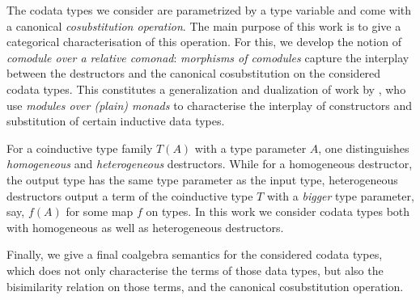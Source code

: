 \documentclass{amsart}
\begin{document}

 The codata types we consider are parametrized by a type variable and come with a canonical \emph{cosubstitution operation}. 
 The main purpose of this work is to give a categorical characterisation
 of this operation. For this, we develop the notion of \emph{comodule over a relative comonad}: \emph{morphisms of comodules} capture the interplay between 
 the destructors and the canonical cosubstitution on the considered codata types.
 This constitutes a generalization and dualization of work by \textcite{DBLP:journals/iandc/HirschowitzM10},
 who use \emph{modules over (plain) monads} to characterise the interplay of constructors and substitution of certain inductive data types.
 
 For a coinductive type family $T(A)$ with a type parameter $A$, one distinguishes \emph{homogeneous} and \emph{heterogeneous} destructors.
 While for a homogeneous destructor, the output type has the same type parameter as the input type, 
 heterogeneous destructors output a term of the coinductive type $T$ with a \emph{bigger} type parameter, say, $f(A)$ for some map $f$ on types.
 In this work we consider codata types both with homogeneous as well as heterogeneous destructors. 
 
 Finally, we give a final coalgebra semantics for the considered codata types, which does not only characterise the terms of those data types,
 but also the bisimilarity relation on those terms, and the canonical cosubstitution operation.
  
  
\end{document}
